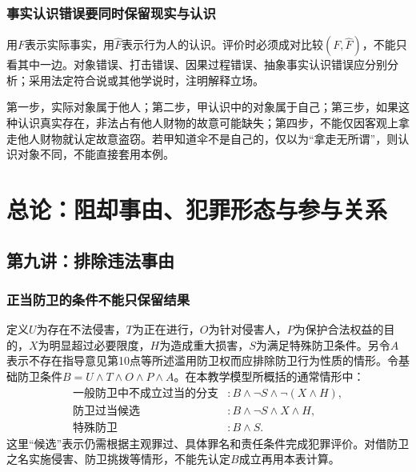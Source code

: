\subsection{事实认识错误要同时保留现实与认识}
用$F$表示实际事实，用$\widehat F$表示行为人的认识。评价时必须成对比较$(F,\widehat F)$，不能只看其中一边。对象错误、打击错误、因果过程错误、抽象事实认识错误应分别分析；采用法定符合说或其他学说时，注明解释立场。

第一步，实际对象属于他人；第二步，甲认识中的对象属于自己；第三步，如果这种认识真实存在，非法占有他人财物的故意可能缺失；第四步，不能仅因客观上拿走他人财物就认定故意盗窃。若甲知道伞不是自己的，仅以为“拿走无所谓”，则认识对象不同，不能直接套用本例。


\chapter{总论：阻却事由、犯罪形态与参与关系}

\section{第九讲：排除违法事由}
\subsection{正当防卫的条件不能只保留结果}

定义$U$为存在不法侵害，$T$为正在进行，$O$为针对侵害人，$P$为保护合法权益的目的，$X$为明显超过必要限度，$H$为造成重大损害，$S$为满足特殊防卫条件。另令$A$表示不存在指导意见第10点等所述滥用防卫权而应排除防卫行为性质的情形。令基础防卫条件$B=U\wedge T\wedge O\wedge P\wedge A$。在本教学模型所概括的通常情形中：
\begin{align*}
 \text{一般防卫中不成立过当的分支}&:B\wedge\neg S\wedge\neg(X\wedge H),\\
 \text{防卫过当候选}&:B\wedge\neg S\wedge X\wedge H,\\
 \text{特殊防卫}&:B\wedge S.
\end{align*}
这里“候选”表示仍需根据主观罪过、具体罪名和责任条件完成犯罪评价。对借防卫之名实施侵害、防卫挑拨等情形，不能先认定$B$成立再用本表计算。

